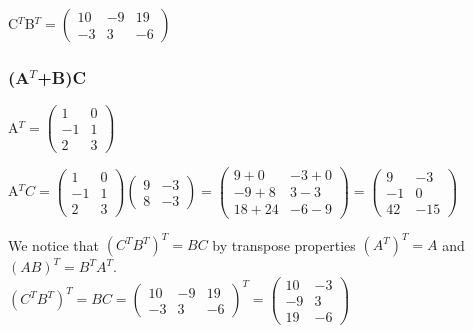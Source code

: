 \documentclass{article}
\begin{document}
C$^{T}$B$^{T}=
\left (
    \begin{matrix}
        10 & -9 & 19\\
        -3 & 3 & -6
    \end{matrix}
\right )
$

\subsubsection*{(A$^{T}$+B)C}
A$^{T}=
\left (
    \begin{matrix}
        1 & 0\\
        -1 & 1\\
        2 & 3
    \end{matrix}
\right )
$

A$^{T}C=
\left (
    \begin{matrix}
        1 & 0\\
        -1 & 1\\
        2 & 3
    \end{matrix}
\right )
\left (
    \begin{matrix}
        9 & -3\\
        8 & -3
    \end{matrix}
\right )
=
\left (
    \begin{matrix}
        9 + 0 & -3 + 0\\
        -9 + 8 & 3 - 3\\
        18 + 24 & -6 - 9
    \end{matrix}
\right )
=
\left (
    \begin{matrix}
        9 & -3\\
        -1 & 0\\
        42 & -15
    \end{matrix}
\right )
$

We notice that $(C^{T}B^{T})^{T} = BC$ by transpose properties $(A^{T})^{T}=A$ and $(AB)^{T}=B^{T}A^{T}$.\\
$(C^{T}B^{T})^{T} = BC =
\left (
    \begin{matrix}
        10 & -9 & 19\\
        -3 & 3 & -6
    \end{matrix}
\right )
^{T}=
\left (
    \begin{matrix}
        10 & -3\\
        -9 & 3\\
        19 & -6
    \end{matrix}
\right )
$
\end{document}
